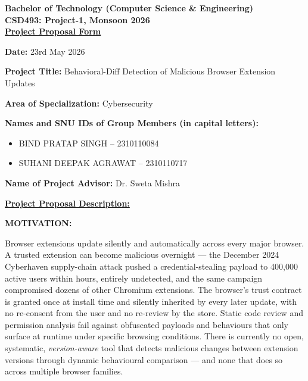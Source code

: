 \documentclass[12pt]{article}
\begin{document}
\begin{center}
    {\bfseries Bachelor of Technology (Computer Science \& Engineering)}\\[2pt]
    {\bfseries CSD493: Project-1, Monsoon 2026}\\[2pt]
    {\bfseries \underline{Project Proposal Form}}
\end{center}

\vspace{0.6em}

\textbf{Date:} 23rd May 2026

\vspace{0.6em}

\textbf{Project Title:} Behavioral-Diff Detection of Malicious Browser Extension Updates

\vspace{0.6em}

\textbf{Area of Specialization:} Cybersecurity

\vspace{0.6em}

\textbf{Names and SNU IDs of Group Members (in capital letters):}
\begin{itemize}
    \item[(i)] BIND PRATAP SINGH -- 2310110084
    \item[(ii)] SUHANI DEEPAK AGRAWAT -- 2310110717
\end{itemize}

\vspace{0.4em}

\textbf{Name of Project Advisor:} Dr. Sweta Mishra

\vspace{0.8em}

\textbf{\underline{Project Proposal Description:}}

\vspace{0.4em}

\textbf{MOTIVATION:}

Browser extensions update silently and automatically across every major browser. A trusted
extension can become malicious overnight --- the December 2024 Cyberhaven supply-chain attack
pushed a credential-stealing payload to 400,000 active users within hours, entirely undetected,
and the same campaign compromised dozens of other Chromium extensions. The browser's trust
contract is granted once at install time and silently inherited by every later update, with no
re-consent from the user and no re-review by the store. Static code review and permission analysis
fail against obfuscated payloads and behaviours that only surface at runtime under specific
browsing conditions. There is currently no open, systematic, \emph{version-aware} tool that detects
malicious changes between extension versions through dynamic behavioural comparison --- and none
that does so across multiple browser families.
\end{document}
